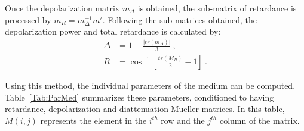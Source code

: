 \noindent Once the depolarization matrix $m_{\Delta}$ is obtained, the sub-matrix of retardance is processed by $m_{R} = m_{\Delta}^{-1} m'$.
Following the sub-matrices obtained, the depolarization power and total retardance is calculated by: 
\begin{align}
\Delta & = 1 - \frac{\vert tr(m_{\Delta}) \vert}{3}~,\\
R  & = \cos^{-1} \left[ \frac{tr(M_{R})}{2} - 1\right]~.
\end{align}

%	
%	

Using this method, the individual parameters of the medium can be computed.
Table~\ref{Tab:ParMed} summarizes these parameters, conditioned to having retardance, depolarization and diattenuation Mueller matrices.
In this table, $M(i,j)$ represents the element in the $i^{th}$ row and the $j^{th}$ column of the matrix. 

